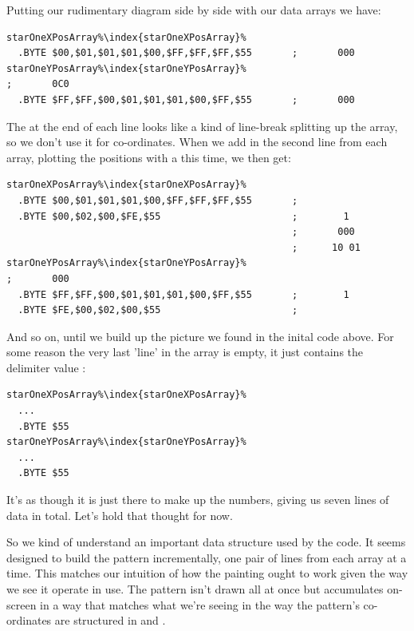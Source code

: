Putting our rudimentary diagram side by side with our data arrays we have:
\begin{lstlisting}[escapechar=\%]
starOneXPosArray%\index{starOneXPosArray}%  
  .BYTE $00,$01,$01,$01,$00,$FF,$FF,$FF,$55       ;       000      
starOneYPosArray%\index{starOneYPosArray}%                                  ;       0C0        
  .BYTE $FF,$FF,$00,$01,$01,$01,$00,$FF,$55       ;       000      
\end{lstlisting}

The  at the end of each line looks like a kind of line-break splitting up the array, so we don't use it for
co-ordinates. 
When we add in the second line from each array, plotting the positions with a  this time, we then get:

\begin{lstlisting}[caption=Source code for the Star.,escapechar=\%]
starOneXPosArray%\index{starOneXPosArray}%  
  .BYTE $00,$01,$01,$01,$00,$FF,$FF,$FF,$55       ;                
  .BYTE $00,$02,$00,$FE,$55                       ;        1 
                                                  ;       000      
                                                  ;      10 01       
starOneYPosArray%\index{starOneYPosArray}%                                  ;       000
  .BYTE $FF,$FF,$00,$01,$01,$01,$00,$FF,$55       ;        1  
  .BYTE $FE,$00,$02,$00,$55                       ; 
\end{lstlisting}

And so on, until we build up the picture we found in the inital code above. For some reason the very last 'line' in the 
array is empty, it just contains the delimiter value :

\begin{lstlisting}[escapechar=\%]
starOneXPosArray%\index{starOneXPosArray}%  
  ...
  .BYTE $55  
starOneYPosArray%\index{starOneYPosArray}%  
  ...
  .BYTE $55      
\end{lstlisting}

It's as though it is just there to make up the numbers, giving us
seven lines of data in total. Let's hold that thought for now.

So we kind of understand an important data structure used
by the code. It seems designed to build the pattern incrementally, one pair of lines from each array at a time.
This matches our intuition of how the painting ought to work given the way we see it operate in use. The pattern isn't drawn
all at once but accumulates on-screen in a way that matches what we're seeing in the way the pattern's co-ordinates
are structured in  and .

